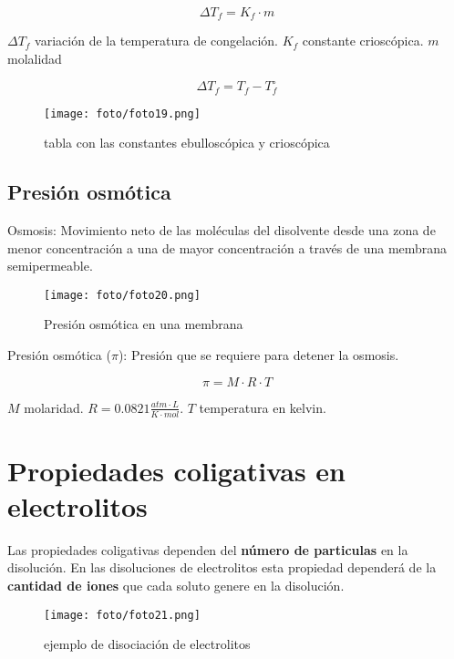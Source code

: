 \documentclass[]{article}
\begin{document}
\begin{equation}
\Delta T_{f}=K_{f} \cdot m
\end{equation}

$\Delta T_{f}$ variación de la temperatura de congelación. $K_{f}$ constante crioscópica. $m$ molalidad

\begin{equation}
\Delta T_{f}=T_{f}-T_{f}^{\circ}
\end{equation}

\begin{figure}[H]
\center
\texttt{[image: foto/foto19.png]}
\caption{tabla con las constantes ebulloscópica y crioscópica}
\end{figure}



\subsection{Presión osmótica}
Osmosis: Movimiento neto de las moléculas del disolvente desde una zona de menor concentración a una de mayor concentración a través de una membrana semipermeable.

\begin{figure}[H]
\center
\texttt{[image: foto/foto20.png]}
\caption{Presión osmótica en una membrana}
\end{figure}

Presión osmótica ($\pi$): Presión que se requiere para detener la osmosis.

\begin{equation}
 \pi = M \cdot R \cdot T
 \end{equation} 

$M$ molaridad. $R=0.0821 \frac{atm \cdot L}{K \cdot mol}$. $T$ temperatura en kelvin.



\section{Propiedades coligativas en electrolitos}
Las propiedades coligativas dependen del \textbf{número de particulas} en la disolución. En las disoluciones de electrolitos esta propiedad dependerá de la \textbf{cantidad de iones} que cada soluto genere en la disolución.

\begin{figure}[H]
\center
\texttt{[image: foto/foto21.png]}
\caption{ejemplo de disociación de electrolitos}
\end{figure}
\end{document}

